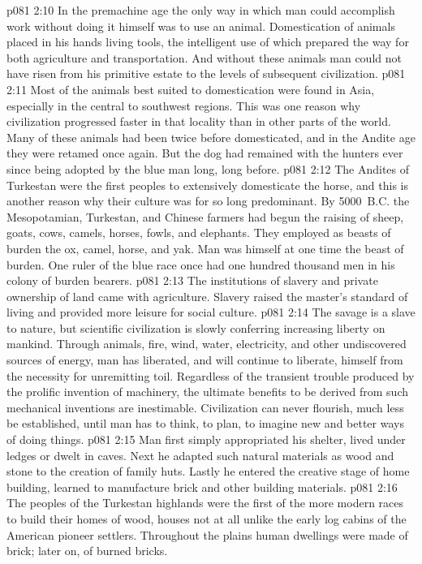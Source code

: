 \pc \vs p081 2:10 In the premachine age the only way in which man could accomplish work without doing it himself was to use an animal. Domestication of animals placed in his hands living tools, the intelligent use of which prepared the way for both agriculture and transportation. And without these animals man could not have risen from his primitive estate to the levels of subsequent civilization.
\vs p081 2:11 Most of the animals best suited to domestication were found in Asia, especially in the central to southwest regions. This was one reason why civilization progressed faster in that locality than in other parts of the world. Many of these animals had been twice before domesticated, and in the Andite age they were retamed once again. But the dog had remained with the hunters ever since being adopted by the blue man long, long before.
\vs p081 2:12 The Andites of Turkestan were the first peoples to extensively domesticate the horse, and this is another reason why their culture was for so long predominant. By 5000~B.C. the Mesopotamian, Turkestan, and Chinese farmers had begun the raising of sheep, goats, cows, camels, horses, fowls, and elephants. They employed as beasts of burden the ox, camel, horse, and yak. Man was himself at one time the beast of burden. One ruler of the blue race once had one hundred thousand men in his colony of burden bearers.
\pc \vs p081 2:13 The institutions of slavery and private ownership of land came with agriculture. Slavery raised the master’s standard of living and provided more leisure for social culture.
\vs p081 2:14 The savage is a slave to nature, but scientific civilization is slowly conferring increasing liberty on mankind. Through animals, fire, wind, water, electricity, and other undiscovered sources of energy, man has liberated, and will continue to liberate, himself from the necessity for unremitting toil. Regardless of the transient trouble produced by the prolific invention of machinery, the ultimate benefits to be derived from such mechanical inventions are inestimable. Civilization can never flourish, much less be established, until man has  to think, to plan, to imagine new and better ways of doing things.
\pc \vs p081 2:15 Man first simply appropriated his shelter, lived under ledges or dwelt in caves. Next he adapted such natural materials as wood and stone to the creation of family huts. Lastly he entered the creative stage of home building, learned to manufacture brick and other building materials.
\vs p081 2:16 The peoples of the Turkestan highlands were the first of the more modern races to build their homes of wood, houses not at all unlike the early log cabins of the American pioneer settlers. Throughout the plains human dwellings were made of brick; later on, of burned bricks.
